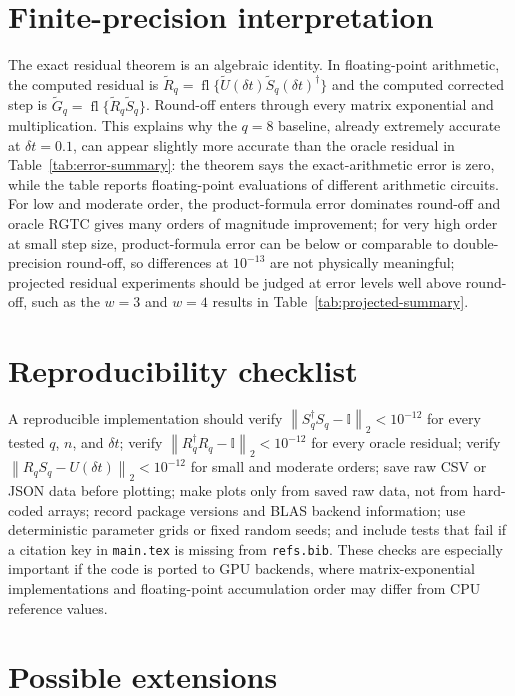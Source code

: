 \documentclass[aps,prresearch,reprint,superscriptaddress,nofootinbib,amsmath,amssymb]{revtex4-2}
\newcommand{\rgtc}{RGTC}
\newcommand{\norm}[1]{\left\lVert #1 \right\rVert}
\newcommand{\id}{\mathbb{I}}
\newcommand{\dt}{\delta t}
\begin{document}
\section{Finite-precision interpretation}
\label{app:finite-precision}

The exact residual theorem is an algebraic identity. In floating-point arithmetic, the computed residual is $\widetilde R_q=\operatorname{fl}\{\widetilde U(\dt)\widetilde S_q(\dt)^\dagger\}$ and the computed corrected step is $\widetilde G_q=\operatorname{fl}\{\widetilde R_q\widetilde S_q\}$. Round-off enters through every matrix exponential and multiplication. This explains why the $q=8$ baseline, already extremely accurate at $\dt=0.1$, can appear slightly more accurate than the oracle residual in Table~\ref{tab:error-summary}: the theorem says the exact-arithmetic error is zero, while the table reports floating-point evaluations of different arithmetic circuits. For low and moderate order, the product-formula error dominates round-off and oracle \rgtc{} gives many orders of magnitude improvement; for very high order at small step size, product-formula error can be below or comparable to double-precision round-off, so differences at $10^{-13}$ are not physically meaningful; projected residual experiments should be judged at error levels well above round-off, such as the $w=3$ and $w=4$ results in Table~\ref{tab:projected-summary}.

\section{Reproducibility checklist}
\label{app:repro}

A reproducible implementation should verify $\norm{S_q^\dagger S_q-\id}_2<10^{-12}$ for every tested $q$, $n$, and $\dt$; verify $\norm{R_q^\dagger R_q-\id}_2<10^{-12}$ for every oracle residual; verify $\norm{R_qS_q-U(\dt)}_2<10^{-12}$ for small and moderate orders; save raw CSV or JSON data before plotting; make plots only from saved raw data, not from hard-coded arrays; record package versions and BLAS backend information; use deterministic parameter grids or fixed random seeds; and include tests that fail if a citation key in \texttt{main.tex} is missing from \texttt{refs.bib}. These checks are especially important if the code is ported to GPU backends, where matrix-exponential implementations and floating-point accumulation order may differ from CPU reference values.

\section{Possible extensions}
\label{app:extensions}
\end{document}
